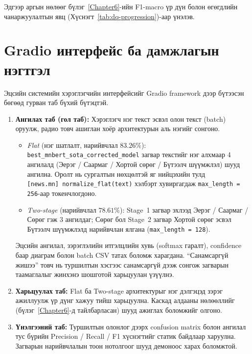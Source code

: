 Эдгээр аргын нөлөөг бүлэг~\ref{Chapter6}-ийн F1-macro үр дүн болон өгөгдлийн
чанаржуулалтын явц (Хүснэгт~\ref{tab:dq-progression})-аар үнэлэв.

\section{Gradio интерфейс ба дамжлагын нэгтгэл}

Эцсийн системийн хэрэглэгчийн интерфейсийг Gradio framework дээр бүтээсэн бөгөөд
гурван таб бүхий бүтэцтэй.

\begin{enumerate}
  \item \textbf{Ангилах таб (гол таб):} Хэрэглэгч нэг текст эсвэл олон текст
    (batch) оруулж, радио товч ашиглан хоёр архитектурын аль нэгийг сонгоно.
    \begin{itemize}
      \item \textit{Flat} (нэг шатлалт, нарийвчлал $\mathbf{83.26\%}$):
        \texttt{best\_mnbert\_sota\_corrected\_model} загвар текстийг нэг алхмаар
        4 ангилалд (Эерэг / Саармаг / Хортой сөрөг / Бүтээлч шүүмжлэл) шууд
        ангилна. Оролт нь сургалтын нөхцөлтэй яг нийцэхийн тулд
        \texttt{[news.mn]~normalize\_flat(text)} хэлбэрт хувиргагдаж
        \texttt{max\_length\,=\,256}-аар токенчлогдоно.
      \item \textit{Two-stage} (нарийвчлал $78.61\%$): Stage~1 загвар эхлээд
        Эерэг / Саармаг / Сөрөг гэж 3 ангилдаг; Сөрөг бол Stage~2 загвар
        Хортой сөрөг эсвэл Бүтээлч шүүмжлэлд нарийвчлан ялгана
        (\texttt{max\_length\,=\,128}).
    \end{itemize}
    Эцсийн ангилал, зэрэглэлийн итгэлцлийн хувь (softmax гаралт),
    confidence баар диаграм болон batch CSV татах боломж харагдана.
    ``Санамсаргүй жишээ'' товч нь туршилтын хэсгээс санамсаргүй дээж сонгож
    загварын таамаглалыг жинхэнэ шошготой харьцуулан үзүүлнэ.
  \item \textbf{Харьцуулах таб:} Flat ба Two-stage архитектурыг нэг дэлгэцэд
    зэрэг ажиллуулж үр дүнг хажуу тийш харьцуулна. Каскад алдааны нөлөөллийг
    (бүлэг~\ref{Chapter6}-д тайлбарласан) шууд ажиглах боломжийг олгоно.
  \item \textbf{Үнэлгээний таб:} Туршилтын олонлог дээрх confusion matrix болон
    ангилал тус бүрийн Precision / Recall / F1 хүснэгтийг статик байдлаар
    харуулна. Загварын нарийвчлалын тоон нотолгоог шууд демоноос харах боломжтой.
\end{enumerate}


